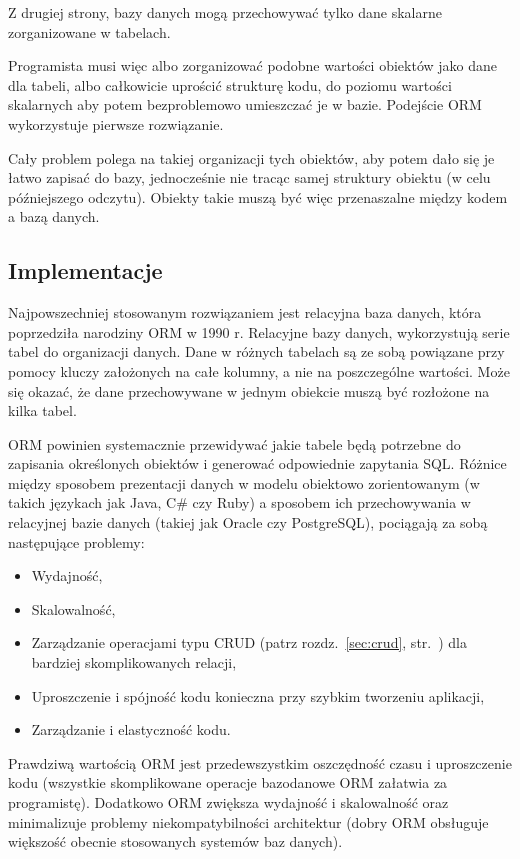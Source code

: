 \documentclass[a4paper,12pt,oneside]{report}
\begin{document}
Z drugiej strony, bazy danych mogą przechowywać tylko dane skalarne zorganizowane w tabelach.

Programista musi więc albo zorganizować podobne wartości obiektów jako dane dla tabeli, albo całkowicie uprościć strukturę kodu, do poziomu wartości skalarnych aby potem bezproblemowo umieszczać je w bazie. Podejście ORM wykorzystuje pierwsze rozwiązanie.

Cały problem polega na takiej organizacji tych obiektów, aby potem dało się je łatwo zapisać do bazy, jednocześnie nie tracąc samej struktury obiektu (w celu późniejszego odczytu). Obiekty takie muszą być więc przenaszalne między kodem a bazą danych.

\subsection{Implementacje}
\label{subsec:orm-implementacje}
Najpowszechniej stosowanym rozwiązaniem jest relacyjna baza danych, która poprzedziła narodziny ORM w 1990 r. Relacyjne bazy danych, wykorzystują serie tabel do organizacji danych. Dane w różnych tabelach są ze sobą powiązane przy pomocy kluczy założonych na całe kolumny, a nie na poszczególne wartości. Może się okazać, że dane przechowywane w jednym obiekcie muszą być rozłożone na kilka tabel.

ORM powinien systemacznie przewidywać jakie tabele będą potrzebne do zapisania określonych obiektów i generować odpowiednie zapytania SQL. Różnice między sposobem prezentacji danych w modelu obiektowo zorientowanym (w takich językach jak Java, C\# czy Ruby) a sposobem ich przechowywania w relacyjnej bazie danych (takiej jak Oracle czy PostgreSQL), pociągają za sobą następujące problemy:
\begin{itemize}
  \item Wydajność,
  \item Skalowalność,
  \item Zarządzanie operacjami typu CRUD (patrz rozdz.~\ref{sec:crud}, str.~\pageref{sec:crud}) dla bardziej skomplikowanych relacji,
  \item Uproszczenie i spójność kodu konieczna przy szybkim tworzeniu aplikacji,
  \item Zarządzanie i elastyczność kodu.
\end{itemize}

Prawdziwą wartością ORM jest przedewszystkim oszczędność czasu i uproszczenie kodu (wszystkie skomplikowane operacje bazodanowe ORM załatwia za programistę). Dodatkowo ORM zwiększa wydajność i skalowalność oraz minimalizuje problemy niekompatybilności architektur (dobry ORM obsługuje większość obecnie stosowanych systemów baz danych).
\end{document}

